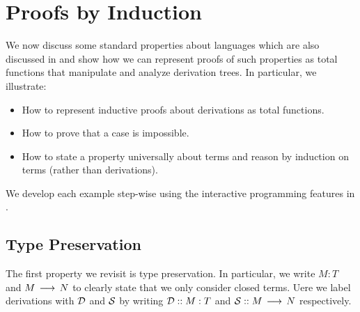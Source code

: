 \chapter{Proofs by Induction}\label{chap:proofs-basic}

We now discuss some standard properties about languages which are also discussed
in \cite{TAPL} and show how we can represent proofs of such properties as total functions that
manipulate and analyze derivation trees. In particular, we illustrate:

\begin{itemize}
\item How to represent inductive proofs about derivations
   as total functions.
\item How to prove that a case is impossible.
\item How to state a property universally about terms and reason by induction on
  terms (rather than derivations).
\end{itemize}

We develop each example step-wise using the interactive programming features in
\beluga.

\section{Type Preservation}

The first property we revisit is type preservation. In particular, we write
$M : T$ and $M \Steps N$ to clearly state that we only consider closed terms.
Uere we label derivations with $\D$ and $\S$ by writing $\proofderiv{\D}{M : T}$
and $\proofderiv{\S}{M \Steps N}$ respectively.

